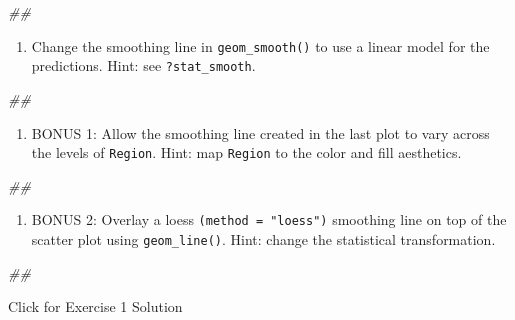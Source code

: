 \documentclass[
]{book}
\newenvironment{Shaded}{\begin{snugshade}}{\end{snugshade}}
\newcommand{\CommentTok}[1]{\textcolor[rgb]{0.56,0.35,0.01}{\textit{#1}}}
\providecommand{\tightlist}{%
  \setlength{\itemsep}{0pt}\setlength{\parskip}{0pt}}
\begin{document}
\begin{Shaded}
\begin{Highlighting}[]
\CommentTok{\#\# }
\end{Highlighting}
\end{Shaded}

\begin{enumerate}
\def\labelenumi{\arabic{enumi}.}
\setcounter{enumi}{3}
\tightlist
\item
  Change the smoothing line in \texttt{geom\_smooth()} to use a linear model for the predictions. Hint: see \texttt{?stat\_smooth}.
\end{enumerate}

\begin{Shaded}
\begin{Highlighting}[]
\CommentTok{\#\# }
\end{Highlighting}
\end{Shaded}

\begin{enumerate}
\def\labelenumi{\arabic{enumi}.}
\setcounter{enumi}{4}
\tightlist
\item
  BONUS 1: Allow the smoothing line created in the last plot to vary across the levels of \texttt{Region}. Hint: map \texttt{Region} to the color and fill aesthetics.
\end{enumerate}

\begin{Shaded}
\begin{Highlighting}[]
\CommentTok{\#\# }
\end{Highlighting}
\end{Shaded}

\begin{enumerate}
\def\labelenumi{\arabic{enumi}.}
\setcounter{enumi}{5}
\tightlist
\item
  BONUS 2: Overlay a loess \texttt{(method\ =\ "loess")} smoothing line on top of the scatter plot using \texttt{geom\_line()}. Hint: change the statistical transformation.
\end{enumerate}

\begin{Shaded}
\begin{Highlighting}[]
\CommentTok{\#\# }
\end{Highlighting}
\end{Shaded}

{Click for Exercise 1 Solution}
\end{document}
